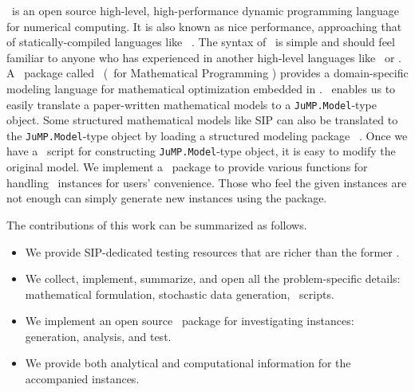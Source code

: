\julia\ is an open source high-level, high-performance dynamic programming language for numerical computing. It is also known as nice performance, approaching that of statically-compiled languages like \clang\ \cite{journal:BEKS2017}. The syntax of \julia\ is simple and should feel familiar to anyone who has experienced in another high-level languages like \matlab\ or \python. A \julia\ package called \jump\ (\julia\ for Mathematical Programming \cite{journal:JuMP}) provides a domain-specific modeling language for mathematical optimization embedded in \julia. \jump\ enables us to easily translate a paper-written mathematical models to a \texttt{JuMP.Model}-type object. Some structured mathematical models like SIP can also be translated to the \texttt{JuMP.Model}-type object by loading a structured modeling package \structjump\ \cite{web:StructJuMP}. Once we have a \julia\ script for constructing \texttt{JuMP.Model}-type object, it is easy to modify the original model. %
We implement a \julia\ package to provide various functions for handling \siplibtwo\ instances for users' convenience. Those who feel the given instances are not enough can simply generate new instances using the package.


The contributions of this work can be summarized as follows.
\begin{itemize}
	\item We provide SIP-dedicated testing resources that are richer than the former \siplib.
	\item We collect, implement, summarize, and open all the problem-specific details: mathematical formulation, stochastic data generation, \julia\ scripts.
	\item We implement an open source \julia\ package for investigating instances: generation, analysis, and test.
	\item We provide both analytical and computational information for the accompanied instances.
\end{itemize}


